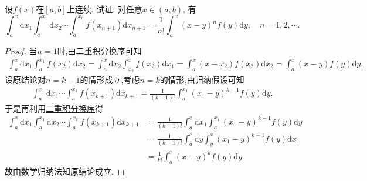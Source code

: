 \documentclass[../../main.tex]{subfiles}%
\begin{document}
\begin{proposition}\label{proposition:多重积分递推公式}
设$f(x)$在$[a,b]$上连续, 试证: 对任意$x \in (a,b)$, 有
\[
\int_{a}^{x} \mathrm{d}x_1 \int_{a}^{x_1} \mathrm{d}x_2 \cdots \int_{a}^{x_n} f(x_{n + 1}) \mathrm{d}x_{n + 1} = \frac{1}{n!} \int_{a}^{x} (x - y)^n f(y) \mathrm{d}y, \quad n = 1,2,\cdots.
\]
\end{proposition}
\begin{proof}
当$n=1$时,由\hyperref[theorem:二重积分换序]{二重积分换序}可知
\begin{align*}
\int_a^x \mathrm{d}x_1 \int_a^{x_1} f(x_2) \mathrm{d}x_2 = \int_a^x \mathrm{d}x_2 \int_{x_2}^x f(x_2) \mathrm{d}x_1 = \int_a^x (x-x_2) f(x_2) \mathrm{d}x_2 = \int_a^x (x-y) f(y) \mathrm{d}y.
\end{align*}
设原结论对$n=k-1$的情形成立,考虑$n=k$的情形,由归纳假设可知
\begin{align*}
\int_a^{x_1} \mathrm{d}x_1 \cdots \int_a^{x_k} f(x_{k+1}) \mathrm{d}x_{k+1} = \frac{1}{(k-1)!} \int_a^{x_1} (x_1-y)^{k-1} f(y) \mathrm{d}y.
\end{align*}
于是再利用\hyperref[theorem:二重积分换序]{二重积分换序}得
\begin{align*}
\int_a^x \mathrm{d}x_1 \int_a^{x_1} \mathrm{d}x_2 \cdots \int_a^{x_k} f(x_{k+1}) \mathrm{d}x_{k+1} &= \frac{1}{(k-1)!} \int_a^x \mathrm{d}x_1 \int_a^{x_1} (x_1-y)^{k-1} f(y) \mathrm{d}y \\
&= \frac{1}{(k-1)!} \int_a^x \mathrm{d}y \int_y^x (x_1-y)^{k-1} f(y) \mathrm{d}x_1 \\
&= \frac{1}{k!} \int_a^x (x-y)^k f(y) \mathrm{d}y.
\end{align*}
故由数学归纳法知原结论成立.
\end{proof}
\end{document}
